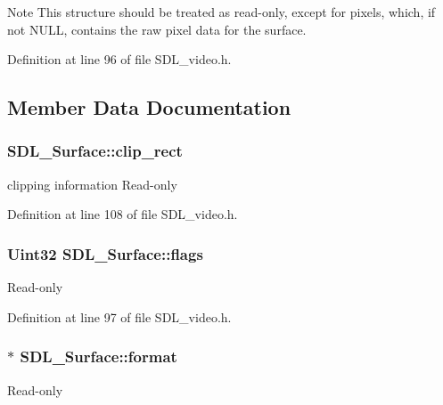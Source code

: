 \begin{DoxyNote}{Note}
This structure should be treated as read-\/only, except for {\ttfamily pixels}, which, if not N\+U\+L\+L, contains the raw pixel data for the surface. 
\end{DoxyNote}


Definition at line 96 of file S\+D\+L\+\_\+video.\+h.



\subsection{Member Data Documentation}
\hypertarget{structSDL__Surface_aa9a0da3b38261dad6cf0cc4e3bb5b0c3}{
\subsubsection[{clip\+\_\+rect}]{ S\+D\+L\+\_\+\+Surface\+::clip\+\_\+rect}}\label{structSDL__Surface_aa9a0da3b38261dad6cf0cc4e3bb5b0c3}
clipping information Read-\/only 

Definition at line 108 of file S\+D\+L\+\_\+video.\+h.

\hypertarget{structSDL__Surface_a86d78b665d5dfd7aa1dd9696b067641b}{
\subsubsection[{flags}]{\setlength{\rightskip}{0pt plus 5cm}Uint32 S\+D\+L\+\_\+\+Surface\+::flags}}\label{structSDL__Surface_a86d78b665d5dfd7aa1dd9696b067641b}
Read-\/only 

Definition at line 97 of file S\+D\+L\+\_\+video.\+h.

\hypertarget{structSDL__Surface_a8558348b1d6ad1def317d8c75e0f0080}{
\subsubsection[{format}]{ $\ast$ S\+D\+L\+\_\+\+Surface\+::format}}\label{structSDL__Surface_a8558348b1d6ad1def317d8c75e0f0080}
Read-\/only 

